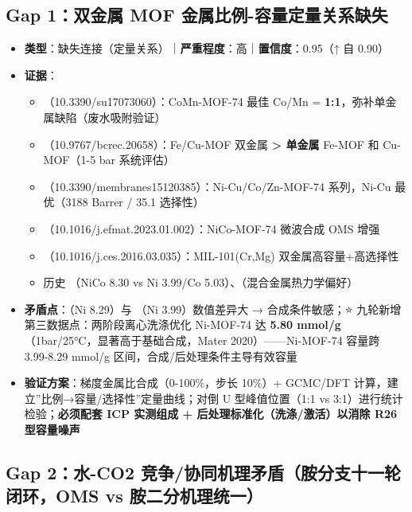 \documentclass[12pt,a4paper]{ctexart}
\providecommand{\tightlist}{%
  \setlength{\itemsep}{0pt}\setlength{\parskip}{0pt}}
\begin{document}
\subsection{Gap 1：双金属 MOF 金属比例-容量定量关系缺失}\label{gap:gap-1ux53ccux91d1ux5c5e-mof-ux91d1ux5c5eux6bd4ux4f8b-ux5bb9ux91cfux5b9aux91cfux5173ux7cfbux7f3aux5931}

\begin{itemize}
\tightlist
\item
  \textbf{类型}：缺失连接（定量关系）｜\textbf{严重程度}：高｜\textbf{置信度}：0.95（↑ 自 0.90）
\item
  \textbf{证据}：

  \begin{itemize}
  \tightlist
  \item
    \cite{p65}（10.3390/su17073060）：CoMn-MOF-74 最佳 Co/Mn = \textbf{1:1}，弥补单金属缺陷（废水吸附验证）
  \item
    \cite{p67}（10.9767/bcrec.20658）：Fe/Cu-MOF 双金属 \textbf{\textgreater{} 单金属} Fe-MOF 和 Cu-MOF（1-5 bar 系统评估）
  \item
    \cite{p22}（10.3390/membranes15120385）：Ni-Cu/Co/Zn-MOF-74 系列，Ni-Cu 最优（3188 Barrer / 35.1 选择性）
  \item
    \cite{p24}（10.1016/j.efmat.2023.01.002）：NiCo-MOF-74 微波合成 OMS 增强
  \item
    \cite{p147}（10.1016/j.ces.2016.03.035）：MIL-101(Cr,Mg) 双金属高容量+高选择性
  \item
    历史 \cite{p62}（NiCo 8.30 vs Ni 3.99/Co 5.03）、\cite{p169}（混合金属热力学偏好）
  \end{itemize}
\item
  \textbf{矛盾点}：\cite{p20}（Ni 8.29）与 \cite{p62}（Ni 3.99）数值差异大 → 合成条件敏感；⭐ 九轮新增第三数据点：两阶段离心洗涤优化 Ni-MOF-74 达 \textbf{5.80 mmol/g}（1bar/25°C，显著高于基础合成，Mater 2020）------Ni-MOF-74 容量跨 3.99-8.29 mmol/g 区间，合成/后处理条件主导有效容量
\item
  \textbf{验证方案}：梯度金属比合成（0-100\%，步长 10\%）+ GCMC/DFT 计算，建立''比例→容量/选择性''定量曲线；对倒 U 型峰值位置（1:1 vs 3:1）进行统计检验；\textbf{必须配套 ICP 实测组成 + 后处理标准化（洗涤/激活）以消除 R26 型容量噪声}
\end{itemize}

\subsection{Gap 2：水-CO2 竞争/协同机理矛盾（胺分支十一轮闭环，OMS vs 胺二分机理统一）}\label{gap:gap-2ux6c34-co2-ux7adeux4e89ux534fux540cux673aux7406ux77dbux76feux80faux5206ux652fux5341ux4e00ux8f6eux95edux73afoms-vs-ux80faux4e8cux5206ux673aux7406ux7edfux4e00}
\end{document}
